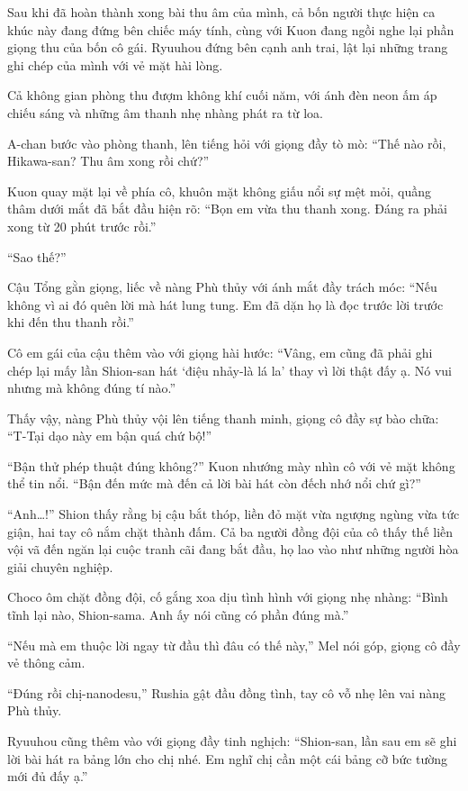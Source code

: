\documentclass[../main.tex]{subfiles}
\begin{document}
\omk

Sau khi đã hoàn thành xong bài thu âm của mình, cả bốn người thực hiện ca khúc này đang đứng bên chiếc máy tính, cùng với Kuon đang ngồi nghe lại phần giọng thu của bốn cô gái. Ryuuhou đứng bên cạnh anh trai, lật lại những trang ghi chép của mình với vẻ mặt hài lòng.

Cả không gian phòng thu đượm không khí cuối năm, với ánh đèn neon ấm áp chiếu sáng và những âm thanh nhẹ nhàng phát ra từ loa.

A-chan bước vào phòng thanh, lên tiếng hỏi với giọng đầy tò mò: ``Thế nào rồi, Hikawa-san? Thu âm xong rồi chứ?''

Kuon quay mặt lại về phía cô, khuôn mặt không giấu nổi sự mệt mỏi, quầng thâm dưới mắt đã bắt đầu hiện rõ: ``Bọn em vừa thu thanh xong. Đáng ra phải xong từ 20 phút trước rồi.''

``Sao thế?''

Cậu Tổng gằn giọng, liếc về nàng Phù thủy với ánh mắt đầy trách móc: ``Nếu không vì ai đó quên lời mà hát lung tung. Em đã dặn họ là đọc trước lời trước khi đến thu thanh rồi.''

Cô em gái của cậu thêm vào với giọng hài hước: ``Vâng, em cũng đã phải ghi chép lại mấy lần Shion-san hát `điệu nhảy-là lá la' thay vì lời thật đấy ạ. Nó vui nhưng mà không đúng tí nào.''

Thấy vậy, nàng Phù thủy vội lên tiếng thanh minh, giọng cô đầy sự bào chữa: ``T-Tại dạo này em bận quá chứ bộ!''

``Bận thử phép thuật đúng không?'' Kuon nhướng mày nhìn cô với vẻ mặt không thể tin nổi. ``Bận đến mức mà đến cả lời bài hát còn đếch nhớ nổi chứ gì?''

``Anh\dots!'' Shion thấy rằng bị cậu bắt thóp, liền đỏ mặt vừa ngượng ngùng vừa tức giận, hai tay cô nắm chặt thành đấm. Cả ba người đồng đội của cô thấy thế liền vội vã đến ngăn lại cuộc tranh cãi đang bắt đầu, họ lao vào như những người hòa giải chuyên nghiệp.

Choco ôm chặt đồng đội, cố gắng xoa dịu tình hình với giọng nhẹ nhàng: ``Bình tĩnh lại nào, Shion-sama. Anh ấy nói cũng có phần đúng mà.''

``Nếu mà em thuộc lời ngay từ đầu thì đâu có thế này,'' Mel nói góp, giọng cô đầy vẻ thông cảm.

``Đúng rồi chị-nanodesu,'' Rushia gật đầu đồng tình, tay cô vỗ nhẹ lên vai nàng Phù thủy.

Ryuuhou cũng thêm vào với giọng đầy tinh nghịch: ``Shion-san, lần sau em sẽ ghi lời bài hát ra bảng lớn cho chị nhé. Em nghĩ chị cần một cái bảng cỡ bức tường mới đủ đấy ạ.''
\end{document}

